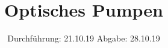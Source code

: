 

\subject{V21}
\title{Optisches Pumpen}
\date{
  Durchführung: 21.10.19
  \hspace{3em}
  Abgabe: 28.10.19
}



\maketitle
\thispagestyle{empty}
\tableofcontents
\newpage




%



\newpage
\printbibliography


